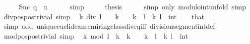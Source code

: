 \begin{isabellebody}
\ \ \isamarkupfalse%
\ \isamarkupfalse%
\ {\isachardoublequoteopen}Suc\ q\ {\isacharequal}{\kern0pt}\ n{\isachardoublequoteclose}\isanewline
\ \ \ \ \isamarkupfalse%
\ simp\isanewline
\ \ \isamarkupfalse%
\ \isamarkupfalse%
\ {\isacharquery}{\kern0pt}thesis\isanewline
\ \ \ \ \isamarkupfalse%
\ {\isacharparenleft}{\kern0pt}simp\ only{\isacharcolon}{\kern0pt}\ modulo{\isacharunderscore}{\kern0pt}int{\isacharunderscore}{\kern0pt}unfold{\isacharparenright}{\kern0pt}\ simp\isanewline
{}\isamarkupfalse%
%
\endisatagproof
{\isafoldproof}%
%
\isadelimproof
\isanewline
%
\endisadelimproof
\isanewline
{}\isamarkupfalse%
\ div{\isacharunderscore}{\kern0pt}pos{\isacharunderscore}{\kern0pt}pos{\isacharunderscore}{\kern0pt}trivial\ {\isacharbrackleft}{\kern0pt}simp{\isacharbrackright}{\kern0pt}{\isacharcolon}{\kern0pt}\isanewline
\ \ {\isachardoublequoteopen}k\ div\ l\ {\isacharequal}{\kern0pt}\ {}{\isachardoublequoteclose}\ \ {\isachardoublequoteopen}k\ {\isasymge}\ {}{\isachardoublequoteclose}\ \ {\isachardoublequoteopen}k\ {\isacharless}{\kern0pt}\ l{\isachardoublequoteclose}\ \ k\ l\ {\isacharcolon}{\kern0pt}{\isacharcolon}{\kern0pt}\ int\isanewline
%
\isadelimproof
\ \ %
\endisadelimproof
%
\isatagproof
{}\isamarkupfalse%
\ that\ \isamarkupfalse%
\ {\isacharparenleft}{\kern0pt}simp\ add{\isacharcolon}{\kern0pt}\ unique{\isacharunderscore}{\kern0pt}euclidean{\isacharunderscore}{\kern0pt}semiring{\isacharunderscore}{\kern0pt}class{\isachardot}{\kern0pt}div{\isacharunderscore}{\kern0pt}eq{\isacharunderscore}{\kern0pt}{}{\isacharunderscore}{\kern0pt}iff\ division{\isacharunderscore}{\kern0pt}segment{\isacharunderscore}{\kern0pt}int{\isacharunderscore}{\kern0pt}def{\isacharparenright}{\kern0pt}%
\endisatagproof
{\isafoldproof}%
%
\isadelimproof
\isanewline
%
\endisadelimproof
\isanewline
{}\isamarkupfalse%
\ mod{\isacharunderscore}{\kern0pt}pos{\isacharunderscore}{\kern0pt}pos{\isacharunderscore}{\kern0pt}trivial\ {\isacharbrackleft}{\kern0pt}simp{\isacharbrackright}{\kern0pt}{\isacharcolon}{\kern0pt}\isanewline
\ \ {\isachardoublequoteopen}k\ mod\ l\ {\isacharequal}{\kern0pt}\ k{\isachardoublequoteclose}\ \ {\isachardoublequoteopen}k\ {\isasymge}\ {}{\isachardoublequoteclose}\ \ {\isachardoublequoteopen}k\ {\isacharless}{\kern0pt}\ l{\isachardoublequoteclose}\ \ k\ l\ {\isacharcolon}{\kern0pt}{\isacharcolon}{\kern0pt}\ int\isanewline

\end{isabellebody}
